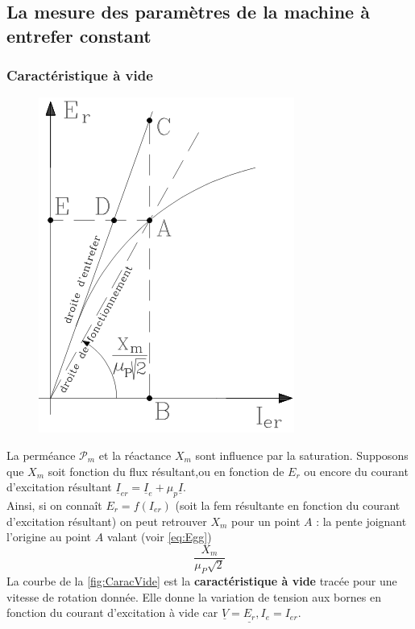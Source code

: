 	\subsection{La mesure des paramètres de la machine à entrefer constant}
	\subsubsection{Caractéristique à vide}
			\begin{figure}
		\vspace{-5mm}
		\includegraphics[scale=0.4]{ch7/image7.png}
		\label{fig:CaracVide}
		\end{figure}		
	La perméance $\mathcal{P}_m$ et la réactance $X_m$ sont influence par la saturation. 
	Supposons que $X_m$ soit fonction du flux résultant,ou en fonction de $E_r$ ou encore 
	du courant d'excitation 
	résultant $\underline{I}_{er} = \underline{I}_e + \mu_p\underline{I}$.\\
	
	Ainsi, si on connaît $E_r = f(I_{er})$ (soit la fem résultante en fonction du courant 
	d'excitation résultant) on peut retrouver $X_m$ pour un point $A$ : la pente joignant 
	l'origine au point $A$ valant (voir \autoref{eq:Egg})
	\begin{equation}
	\dfrac{X_m}{\mu_P\sqrt{2}}
	\end{equation}
	La courbe de la \autoref{fig:CaracVide} est la \textbf{caractéristique à vide} tracée pour 
	une vitesse de rotation donnée. Elle donne la variation de tension aux bornes en fonction 
	du courant d'excitation à vide car $\underline{V}=\underline{E_r}, I_e = I_{er}$.\\
	
